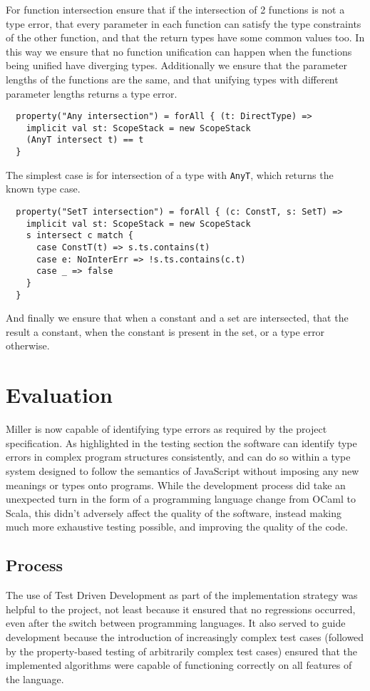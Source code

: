 \documentclass[british, twoside, openright]{bhamthesis}
\theoremstyle{definition}
\begin{document}
      For function intersection ensure that if the intersection of 2 functions is not a type error, that every parameter in each function can satisfy the type constraints of the other function, and that the return types have some common values too. In this way we ensure that no function unification can happen when the functions being unified have diverging types. Additionally we ensure that the parameter lengths of the functions are the same, and that unifying types with different parameter lengths returns a type error.

      \begin{lstlisting}
  property("Any intersection") = forAll { (t: DirectType) =>
    implicit val st: ScopeStack = new ScopeStack
    (AnyT intersect t) == t
  }
      \end{lstlisting}

      The simplest case is for intersection of a type with \texttt{AnyT}, which returns the known type case.

      \begin{lstlisting}
  property("SetT intersection") = forAll { (c: ConstT, s: SetT) =>
    implicit val st: ScopeStack = new ScopeStack
    s intersect c match {
      case ConstT(t) => s.ts.contains(t)
      case e: NoInterErr => !s.ts.contains(c.t)
      case _ => false
    }
  }
      \end{lstlisting}

      And finally we ensure that when a constant and a set are intersected, that the result a constant, when the constant is present in the set, or a type error otherwise.

\chapter{Evaluation}
  Miller is now capable of identifying type errors as required by the project specification. As highlighted in the testing section the software can identify type errors in complex program structures consistently, and can do so within a type system designed to follow the semantics of JavaScript without imposing any new meanings or types onto programs. While the development process did take an unexpected turn in the form of a programming language change from OCaml to Scala, this didn't adversely affect the quality of the software, instead making much more exhaustive testing possible, and improving the quality of the code.

  \section{Process}
    The use of Test Driven Development as part of the implementation strategy was helpful to the project, not least because it ensured that no regressions occurred, even after the switch between programming languages. It also served to guide development because the introduction of increasingly complex test cases (followed by the property-based testing of arbitrarily complex test cases) ensured that the implemented algorithms were capable of functioning correctly on all features of the language.
\end{document}

